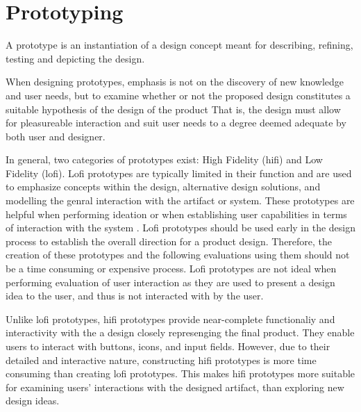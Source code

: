 \section{Prototyping} %
A prototype is an instantiation of a design concept meant for describing, refining, testing and depicting the design.\cite{BUXTON2007139_prototyping}

When designing prototypes, emphasis is not on the discovery of new knowledge and user needs, but to examine whether or not the proposed design constitutes a suitable hypothesis of the design of the product\cite{nielsen-norman-prototype-low-vs-high,BUXTON2007139_prototyping}
That is, the design must allow for pleasureable interaction and suit user needs to a degree deemed adequate by both user and designer.

In general, two categories of prototypes exist: High Fidelity (hifi) and Low Fidelity (lofi).
Lofi prototypes are typically limited in their function and are used to emphasize concepts within the design, alternative design solutions, and modelling the genral interaction with the artifact or system\cite{low-vs-high-fidelity-prototype}.
These prototypes are helpful when performing ideation\cite{nielsen-norman-ideation} or when establishing user capabilities in terms of interaction with the system \cite{usefullness-of-different-prototypes,low-vs-high-fidelity-prototype}.
Lofi prototypes should be used early in the design process to establish the overall direction for a product design. 
Therefore, the creation of these prototypes and the following evaluations using them should not be a time consuming or expensive process. \cite{usefullness-of-different-prototypes,low-vs-high-fidelity-prototype}  
Lofi prototypes are not ideal when performing evaluation of user interaction as they are used to present a design idea to the user, and thus is not interacted with by the user\cite{low-vs-high-fidelity-prototype}.

Unlike lofi prototypes, hifi prototypes provide near-complete functionaliy and interactivity with the a design closely represenging the final product.
They enable users to interact with buttons, icons, and input fields.
However, due to their detailed and interactive nature, constructing hifi prototypes is more time consuming than creating lofi prototypes. 
This makes hifi prototypes more suitable for examining users' interactions with the designed artifact, than exploring new design ideas. \cite{nielsen-norman-prototype-low-vs-high,low-vs-high-fidelity-prototype}



